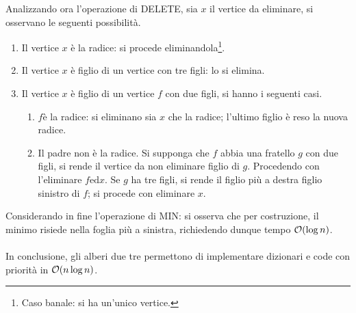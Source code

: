 \documentclass{subfiles}
\begin{document}
\noindent Analizzando ora l'operazione di DELETE, sia \(x\) il vertice da eliminare, si osservano le seguenti possibilità.
\begin{enumerate}
    \item Il vertice \(x\) è la radice: si procede eliminandola\footnote[9]{Caso banale: si ha un'unico vertice.}.
    \item Il vertice \(x\) è figlio di un vertice con tre figli: lo si elimina.
    \item Il vertice \(x\) è figlio di un vertice  \(f\) con due figli, si hanno i seguenti casi.
          \begin{enumerate}
              \item \(f\)è la radice: si eliminano sia \(x\) che la radice; l'ultimo figlio è reso la nuova radice.
              \item Il padre non è la radice. Si supponga che \(f\) abbia una fratello \(g\) con due figli, si rende il vertice da non eliminare figlio di \(g\).
                    Procedendo con l'eliminare \(f \text{ed} x\). Se \(g\) ha tre figli, si rende il figlio più a destra figlio sinistro di \(f\); si procede con eliminare \(x\).
          \end{enumerate}
\end{enumerate}

\noindent Considerando in fine l'operazione di MIN: si osserva che per costruzione, il minimo risiede nella foglia più a sinistra, richiedendo dunque tempo \(\order{\log n}\).
\\ \\
In conclusione, gli alberi due tre permettono di implementare dizionari e code con priorità in \(\order{n \log n}\).
\end{document}
